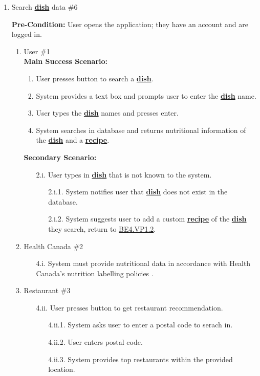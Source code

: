 \documentclass[]{article}
\begin{document}
\begin{enumerate}[{\bf BE1.}]
	\item Search \hyperref[Dish]{\textbf{dish}} data \#6
	
	\textbf{Pre-Condition:} User opens the application; they have an account and are logged in.
		\begin{enumerate}[{\bf VP1.}]
			\item User \#1 \\
				\textbf{Main Success Scenario:} 
				\begin{enumerate}[{1.}]
					\item User presses button to search a \hyperref[Dish]{\textbf{dish}}.
					\item System provides a text box and prompts user to enter the \hyperref[Dish]{\textbf{dish}} name.
					\item User types the \hyperref[Dish]{\textbf{dish}} names and presses enter.
					\item System searches in database and returns nutritional information of the \hyperref[Dish]{\textbf{dish}} and a \hyperref[Recipe]{\textbf{recipe}}.
				\end{enumerate}
				\textbf{Secondary Scenario:}
				\begin{enumerate}
					\item[2.i.] User types in \hyperref[Dish]{\textbf{dish}} that is not known to the system.
					\begin{enumerate}
						\item[2.i.1.] System notifies user that \hyperref[Dish]{\textbf{dish}} does not exist in the database.
						\item[2.i.2.] System suggests user to add a custom \hyperref[Recipe]{\textbf{recipe}} of the \hyperref[Dish]{\textbf{dish}} they search, return to \hyperlink{BE4.VP1.2}{BE4.VP1.2}.
					\end{enumerate}
				\end{enumerate}
			\item Health Canada  \#2
				\begin{enumerate}
					\item[4.i.] System must provide nutritional data in accordance with Health Canada's nutrition labelling policies \cite{CanadaNutrition}.
				\end{enumerate}
			\item Restaurant \#3
				\begin{enumerate}
					\item[4.ii.] User presses button to get restaurant recommendation.
					\begin{enumerate}
						\item[4.ii.1.] System asks user to enter a postal code to serach in.
						\item[4.ii.2.] User enters postal code.
						\item[4.ii.3.] System provides top restaurants within the provided location.
					\end{enumerate}
					

\end{enumerate}
\end{enumerate}
\end{enumerate}
\end{document}
